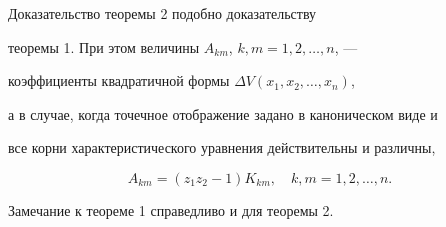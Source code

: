 Доказательство теоремы 2 подобно доказательству


теоремы 1. При этом величины $A_{km}$, $k,m=1,2,\dotsc,n$, ---


коэффициенты квадратичной формы $\Delta V(x_{1},x_{2},\dotsc,x_{n})$,


а в случае, когда точечное отображение задано в каноническом виде и


все корни характеристического уравнения действительны и различны,


$$


A_{km}=(z_{1}z_{2}-1)K_{km},\quad k,m=1,2,\dotsc, n.


$$





Замечание к теореме 1 справедливо и для теоремы 2.








